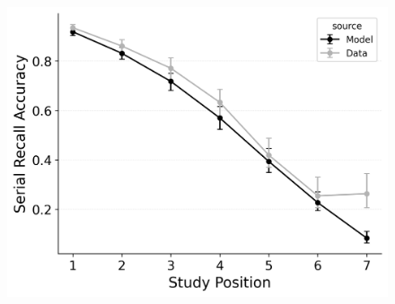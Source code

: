 \documentclass[
  man,
  floatsintext,
  longtable,
  nolmodern,
  notxfonts,
  notimes,
  draftfirst,
  colorlinks=true,linkcolor=blue,citecolor=blue,urlcolor=blue]{apa7}
\begin{document}
\begin{figure}
\begin{minipage}{0.33\linewidth}
\includegraphics{figures/bw_Gordon2021_BaseCMR_Confusable_Fitting_srac_LL7.png}\end{minipage}%

\end{figure}%
\end{document}
